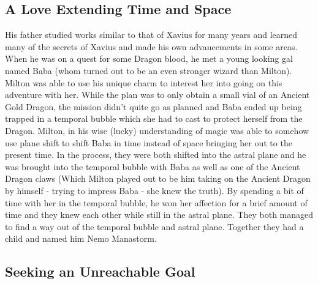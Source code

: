 \documentclass[letterpaper,10pt,twoside,twocolumn,openany]{book}
\begin{document}
\subsection{A Love Extending Time and Space}

His father studied works similar to that of Xavius for many years and learned many of the secrets of Xavius and made his own advancements in some areas. When he was on a quest for some Dragon blood, he met a young looking gal named Baba (whom turned out to be an even stronger wizard than Milton). Milton was able to use his unique charm to interest her into going on this adventure with her. While the plan was to only obtain a small vial of an Ancient Gold Dragon, the mission didn't quite go as planned and Baba ended up being trapped in a temporal bubble which she had to cast to protect herself from the Dragon. Milton, in his wise (lucky) understanding of magic was able to somehow use plane shift to shift Baba in time instead of space bringing her out to the present time. In the process, they were both shifted into the astral plane and he was brought into the temporal bubble with Baba as well as one of the Ancient Dragon claws (Which Milton played out to be him taking on the Ancient Dragon by himself - trying to impress Baba - she knew the truth). By spending a bit of time with her in the temporal bubble, he won her affection for a brief amount of time and they knew each other while still in the astral plane. They both managed to find a way out of the temporal bubble and astral plane. Together they had a child and named him Nemo Manastorm.

\subsection{Seeking an Unreachable Goal}
\end{document}

